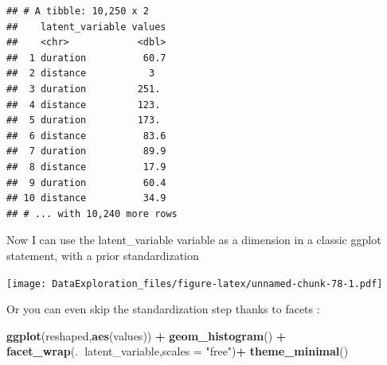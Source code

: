 \documentclass[
]{book}
\newenvironment{Shaded}{\begin{snugshade}}{\end{snugshade}}
\newcommand{\DataTypeTok}[1]{\textcolor[rgb]{0.13,0.29,0.53}{#1}}
\newcommand{\KeywordTok}[1]{\textcolor[rgb]{0.13,0.29,0.53}{\textbf{#1}}}
\newcommand{\NormalTok}[1]{#1}
\newcommand{\OperatorTok}[1]{\textcolor[rgb]{0.81,0.36,0.00}{\textbf{#1}}}
\newcommand{\StringTok}[1]{\textcolor[rgb]{0.31,0.60,0.02}{#1}}
\begin{document}
\begin{Shaded}
\end{Shaded}

\begin{verbatim}
## # A tibble: 10,250 x 2
##    latent_variable values
##    <chr>            <dbl>
##  1 duration          60.7
##  2 distance           3  
##  3 duration         251. 
##  4 distance         123. 
##  5 duration         173. 
##  6 distance          83.6
##  7 duration          89.9
##  8 distance          17.9
##  9 duration          60.4
## 10 distance          34.9
## # ... with 10,240 more rows
\end{verbatim}

Now I can use the latent\_variable variable as a dimension in a classic ggplot statement, with a prior standardization

\begin{Shaded}
\end{Shaded}

\texttt{[image: DataExploration\_files/figure-latex/unnamed-chunk-78-1.pdf]}

Or you can even skip the standardization step thanks to facets :

\begin{Shaded}
\begin{Highlighting}[]
\KeywordTok{ggplot}\NormalTok{(reshaped,}\KeywordTok{aes}\NormalTok{(values)) }\OperatorTok{+}\StringTok{ }\KeywordTok{geom_histogram}\NormalTok{() }\OperatorTok{+}\StringTok{ }
\StringTok{  }\KeywordTok{facet_wrap}\NormalTok{(.}\OperatorTok{~}\NormalTok{latent_variable,}\DataTypeTok{scales =} \StringTok{"free"}\NormalTok{)}\OperatorTok{+}
\StringTok{  }\KeywordTok{theme_minimal}\NormalTok{()}
\end{Highlighting}
\end{Shaded}
\end{document}
